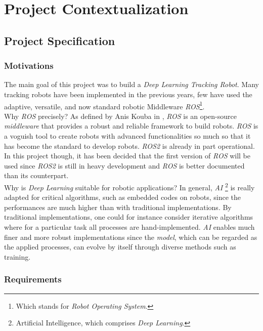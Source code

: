 \clearpage
{}

\chapter{Project Contextualization}

	\section{Project Specification}
	
		\subsection{Motivations}
	
		The main goal of this project was to build a \textit{Deep Learning Tracking Robot}. Many tracking
		robots have been implemented in the previous years, few have used the adaptive, versatile, and 
		now standard robotic Middleware \textit{ROS}\footnote{Which stands for \textit{Robot Operating System}.}.
		\\\indent Why \textit{ROS} precisely? As defined by Anis Kouba in \cite{latexcompanion}, \textit{ROS}
		is an \frstg{} open-source \textit{middleware} \lstg{} that provides a robust and reliable framework 
		to build robots. \textit{ROS} is a voguish tool to create robots with advanced functionalities so much so 
		that it has become the standard to develop robots. \textit{ROS2} is already in part 
		operational. In this project though, 
		it has been decided that the first version of \textit{ROS} will be used since \textit{ROS2} is still 
		in heavy development and \textit{ROS} is better documented than its counterpart.
		\\\indent Why is \textit{Deep Learning} suitable for robotic applications? In general, \textit{AI}
		\footnote{Artificial Intelligence, which comprises \textit{Deep Learning}.}
		is really adapted for critical algorithms, such as embedded codes
		on robots, since the performances are much higher than with traditional implementations. By traditional
		implementations, one could for instance consider iterative algorithms where for a particular task 
		all processes are hand-implemented. \textit{AI} enables much finer and more robust
		implementations since the \textit{model},
		which can be regarded as the applied processes, can evolve by itself through diverse methods such as training.
		 
		\subsection{Requirements}
		
